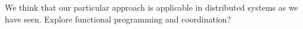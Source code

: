 We think that our particular approach is applicable in distributed systems as we
have seen. Explore functional programming and coordination?
